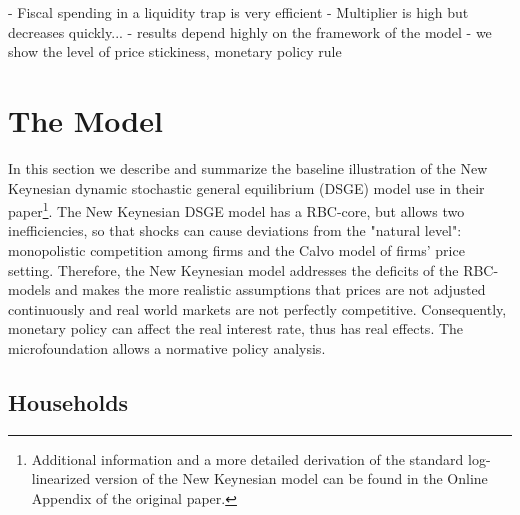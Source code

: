 \documentclass[12pt,a4paper,oneside,titlepage]{article}
\begin{document}
  - Fiscal spending in a liquidity trap is very efficient
  - Multiplier is high but decreases quickly...
  - results depend highly on the framework of the model - we show the level of price stickiness, monetary policy rule

\section{The Model}
In this section we describe and summarize the baseline illustration of the New Keynesian dynamic stochastic general equilibrium (DSGE) model \citet{Erceg.2014} use in their paper\footnote {Additional information and a more detailed derivation of the standard log-linearized version of the New Keynesian model can be found in the Online Appendix of the original paper.}. The New Keynesian DSGE model has a RBC-core, but allows two inefficiencies, so that shocks can cause deviations from the "natural level": monopolistic competition among firms and the Calvo model of firms' price setting. Therefore, the New Keynesian model addresses the deficits of the RBC-models and makes the more realistic assumptions that prices are not adjusted continuously and real world markets are not perfectly competitive. Consequently, monetary policy can affect the real interest rate, thus has real effects. The microfoundation allows a normative policy analysis. 
\subsection*{Households}
\end{document}
